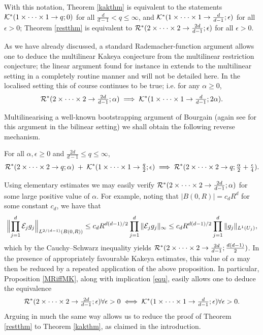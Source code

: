With this notation, Theorem \ref{kakthm} is equivalent to the statements
${\mathcal{K}}^{*}(1\times\cdot\cdot\cdot\times 1\rightarrow
q;0)$ for all $\tfrac{d}{d-1}<q\leq\infty$, and ${\mathcal{K}}^{*}(1\times\cdot\cdot\cdot\times 1\rightarrow
\tfrac{d}{d-1};\epsilon)$ for all $\epsilon>0$;
Theorem \ref{restthm} is equivalent to
${\mathcal{R}}^*(2\times\cdot\cdot\cdot\times 2\rightarrow
\tfrac{2d}{d-1};\epsilon)$ for all $\epsilon>0$.

As we have already discussed, a standard Rademacher-function
argument allows one to deduce the multilinear Kakeya conjecture
from the multilinear restriction conjecture; the linear argument found for instance in
\cite{Wolffbook} extends to the multilinear setting in a completely routine manner
and will not be detailed here. In the localised
setting this of course continues to be true; i.e. for any
$\alpha\geq 0$,
\begin{equation}\label{equ}
{\mathcal{R}}^*(2\times\cdot\cdot\cdot\times 2\rightarrow
\tfrac{2d}{d-1};\alpha) \implies
{\mathcal{K}}^{*}(1\times\cdot\cdot\cdot\times 1\rightarrow
\tfrac{d}{d-1};2\alpha).
\end{equation}

Multilinearising a well-known bootstrapping argument of Bourgain
\cite{Bo} (again see \cite{TVV} for this argument in the bilinear
setting) we shall obtain the following reverse mechanism.
\begin{proposition}\label{MRiffMK}
For all $\alpha,\epsilon\geq 0$ and $\tfrac{2d}{d-1}\leq q\leq\infty$,
$${\mathcal{R}}^*(2\times\cdot\cdot\cdot\times 2\rightarrow q;\alpha)\;+\;
{\mathcal{K}}^{*}(1\times\cdot\cdot\cdot\times 1\rightarrow
\tfrac{q}{2};\epsilon)
\implies
{\mathcal{R}}^*(2\times\cdot\cdot\cdot\times 2\rightarrow
q;\tfrac{\alpha}{2}+\tfrac{\epsilon}{4}).
$$
\end{proposition}
Using elementary estimates we may
easily verify ${\mathcal{R}}^*(2\times\cdot\cdot\cdot\times 2\rightarrow
\tfrac{2d}{d-1};\alpha)$ for some large positive value of
$\alpha$. For example, noting that $|B(0,R)|=c_{d}R^{d}$ for some
constant $c_{d}$, we have that
$$
\Bigl\|\prod_{j=1}^{d}{\mathcal{E}}_{j}g_{j}\Bigr\|_{L^{2/(d-1)}(B(0,R))}\leq
c_{d} R^{d(d-1)/2}\prod_{j=1}^{d} \|{\mathcal{E}}_{j}g_{j}\|_{\infty} \leq
c_{d} R^{d(d-1)/2}\prod_{j=1}^{d}\|g_{j}\|_{L^{1}(U_{j})},
$$
which by the Cauchy--Schwarz inequality yields ${\mathcal{R}}^*(2\times\cdot\cdot\cdot\times 2\rightarrow
\tfrac{2d}{d-1};\tfrac{d(d-1)}{2})$.
In the presence of appropriately favourable Kakeya
estimates, this value of $\alpha$ may then be reduced by a
repeated application of the above proposition. In particular,
Proposition \ref{MRiffMK}, along with implication \eqref{equ},
easily allows one to deduce the equivalence
\begin{equation*}
{\mathcal{R}}^*(2\times\cdot\cdot\cdot\times 2\rightarrow
\tfrac{2d}{d-1};\epsilon)\forall\epsilon>0 \iff
{\mathcal{K}}^{*}(1\times\cdot\cdot\cdot\times 1\rightarrow
\tfrac{d}{d-1};\epsilon)\forall\epsilon>0.
\end{equation*}
Arguing in much the same way allows us to reduce the proof of Theorem
\ref{restthm} to Theorem \ref{kakthm}, as claimed in the introduction.

